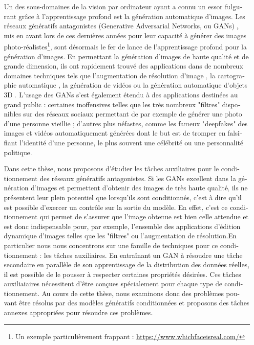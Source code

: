 \begin{otherlanguage}{french}
Un des sous-domaines de la vision par ordinateur ayant a connu un essor fulgurant grâce à l'apprentissage profond est la génération automatique d'images. Les réseaux génératifs antagonistes (Generative Adversarial Networks, ou \ac{GANs}) \citep{Goodfellow2014}, mis en avant lors de ces dernières années pour leur capacité à générer des images photo-réalistes\footnote{Un exemple particulièrement frappant : \url{https://www.whichfaceisreal.com/}}, sont désormais le fer de lance de l'apprentissage profond pour la génération d'images. En permettant la génération d'images de haute qualité et de grande dimension, ils ont rapidement trouvé des applications dans de nombreux domaines techniques tels que l'augmentation de résolution d'image \citep{Wang2020}, la cartographie automatique \citep{Kang2019}, la génération de vidéos \citep{Vondrick2016} ou la génération automatique d'objets 3D \citep{Wu2017}. L'usage des \ac{GANs} s'est également étendu à des applications destinées au grand public : certaines inoffensives telles que les très nombreux "filtres" disponibles sur des réseaux sociaux permettant de par exemple de générer une photo d'une personne vieillie \citep{Antipov2017a}; d'autres plus néfastes, comme les fameux "deepfakes" \citep{Vaccari2020} des images et vidéos automatiquement générées dont le but est de tromper en falsifiant l'identité d'une personne, le plus souvent une célébrité ou une personnalité politique.

Dans cette thèse, nous proposons d'étudier les tâches auxiliaires pour le conditionnement des réseaux génératifs antagonistes. Si les \ac{GANs} excellent dans la génération d'images et permettent d'obtenir des images de très haute qualité, ils ne présentent leur plein potentiel que lorsqu'ils sont conditionnés, c'est à dire  qu'il est possible d'exercer un contrôle sur la sortie du modèle. En effet, c'est ce conditionnement qui permet de s'assurer que l'image obtenue est bien celle attendue et est donc indispensable pour, par exemple, l'ensemble des applications d'édition dynamique d'images telles que les "filtres"  ou l'augmentation de résolution.En particulier nous nous concentrons sur une famille de techniques pour ce conditionnement : les tâches auxiliaires. En entraînant un \ac{GAN} à résoudre une tâche secondaire en parallèle de son apprentissage de la distribution des données réelles, il est possible de le pousser à respecter certaines propriétés désirées. Ces tâches auxiliaiaires nécessitent d'être conçues spécialement pour chaque type de conditionnement. Au cours de cette thèse, nous examinons donc des problèmes pouvant être résolus par des modèles génératifs conditionnées et proposons des tâches annexes appropriées pour résoudre ces problèmes.



\end{otherlanguage}

